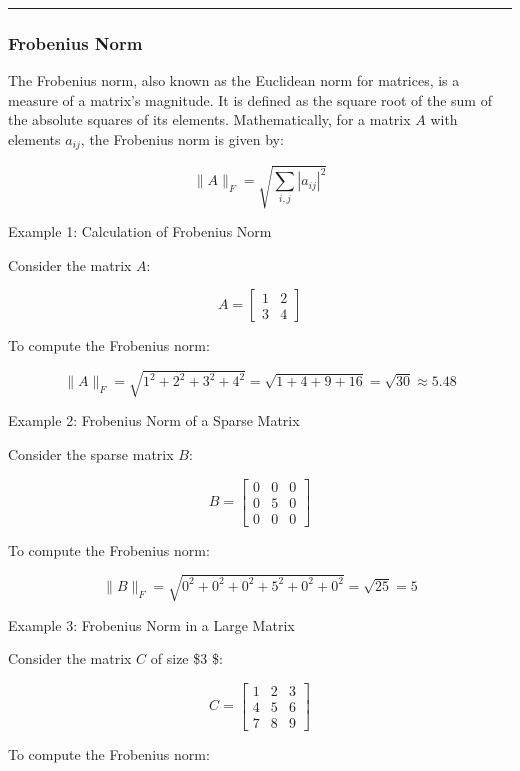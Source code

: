 \documentclass[
  letterpaper,
  DIV=11,
  numbers=noendperiod]{scrreprt}
\theoremstyle{plain}
\theoremstyle{definition}
\theoremstyle{remark}
\begin{document}
\begin{tcolorbox}
\begin{tcolorbox}
\begin{center}\rule{0.5\linewidth}{0.5pt}\end{center}

\subsubsection{Frobenius Norm}\label{frobenius-norm}

The Frobenius norm, also known as the Euclidean norm for matrices, is a
measure of a matrix's magnitude. It is defined as the square root of the
sum of the absolute squares of its elements. Mathematically, for a
matrix \(A\) with elements \(a_{ij}\), the Frobenius norm is given by:

\[\|A\|_F = \sqrt{\sum_{i,j} |a_{ij}|^2}\]

\end{tcolorbox}

Example 1: Calculation of Frobenius Norm

Consider the matrix \(A\):

\[A = \begin{bmatrix}
1 & 2 \\
3 & 4
\end{bmatrix}\]

To compute the Frobenius norm:

\[\|A\|_F = \sqrt{1^2 + 2^2 + 3^2 + 4^2}
= \sqrt{1 + 4 + 9 + 16}
= \sqrt{30}
\approx 5.48\]

Example 2: Frobenius Norm of a Sparse Matrix

Consider the sparse matrix \(B\):

\[B = \begin{bmatrix}
0 & 0 & 0 \\
0 & 5 & 0 \\
0 & 0 & 0
\end{bmatrix}\]

To compute the Frobenius norm:

\[\|B\|_F = \sqrt{0^2 + 0^2 + 0^2 + 5^2 + 0^2 + 0^2}
= \sqrt{25}
= 5\]

Example 3: Frobenius Norm in a Large Matrix

Consider the matrix \(C\) of size \$3  \$:

\[C = \begin{bmatrix}
1 & 2 & 3 \\
4 & 5 & 6 \\
7 & 8 & 9
\end{bmatrix}\]

To compute the Frobenius norm:


\end{tcolorbox}
\end{document}
